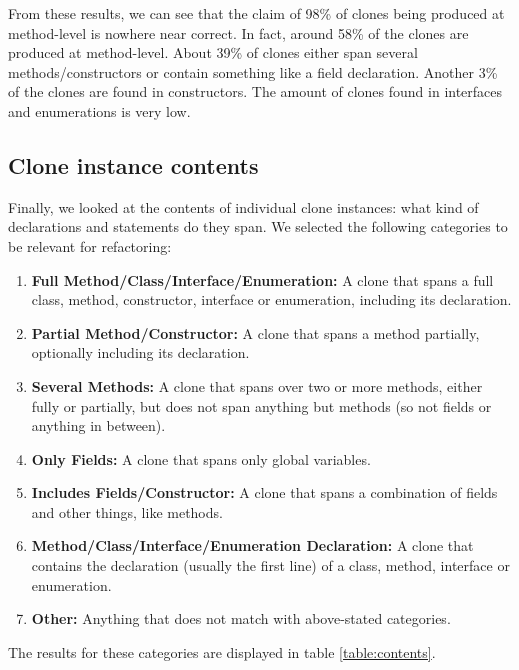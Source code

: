 \documentclass[a4paper]{article}
\begin{document}
From these results, we can see that the claim of 98\% of clones being produced at method-level is nowhere near correct. In fact, around 58\% of the clones are produced at method-level. About 39\% of clones either span several methods/constructors or contain something like a field declaration. Another 3\% of the clones are found in constructors. The amount of clones found in interfaces and enumerations is very low.

\subsection{Clone instance contents}
Finally, we looked at the contents of individual clone instances: what kind of declarations and statements do they span. We selected the following categories to be relevant for refactoring:
\begin{enumerate}
  \item \textbf{Full Method/Class/Interface/Enumeration:} A clone that spans a full class, method, constructor, interface or enumeration, including its declaration.
  \item \textbf{Partial Method/Constructor:} A clone that spans a method partially, optionally including its declaration.
  \item \textbf{Several Methods:} A clone that spans over two or more methods, either fully or partially, but does not span anything but methods (so not fields or anything in between).
  \item \textbf{Only Fields:} A clone that spans only global variables.
  \item \textbf{Includes Fields/Constructor:} A clone that spans a combination of fields and other things, like methods.
  \item \textbf{Method/Class/Interface/Enumeration Declaration:} A clone that contains the declaration (usually the first line) of a class, method, interface or enumeration.
  \item \textbf{Other:} Anything that does not match with above-stated categories.
\end{enumerate}

The results for these categories are displayed in table \ref{table:contents}.
\end{document}
